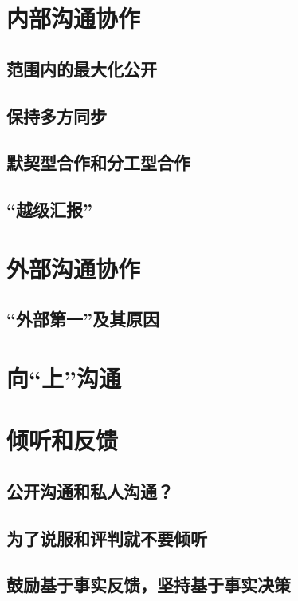 
\section{内部沟通协作}
\subsection{范围内的最大化公开}
\subsection{保持多方同步}
\subsection{默契型合作和分工型合作}
\subsection{“越级汇报”}

\section{外部沟通协作}
\subsection{“外部第一”及其原因}

\section{向“上”沟通}


\section{倾听和反馈}
\subsection{公开沟通和私人沟通？}
\subsection{为了说服和评判就不要倾听}
\subsection{鼓励基于事实反馈，坚持基于事实决策}

